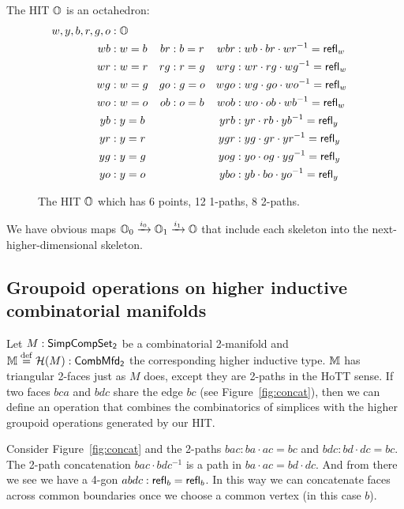 \begin{mydef}
The HIT \( \mathbb{O} \) is an octahedron:
\begin{align*}
w, y, b, r, g, o &: \mathbb{O} \\
wb &: w=b & br &: b=r & wbr &: wb\cdot br\cdot wr^{-1} = \mathsf{refl}_w \\
wr &: w=r & rg &: r=g & wrg &: wr\cdot rg\cdot wg^{-1} = \mathsf{refl}_w \\
wg &: w=g & go &: g=o & wgo &: wg\cdot go\cdot wo^{-1} = \mathsf{refl}_w \\
wo &: w=o & ob &: o=b & wob &: wo\cdot ob\cdot wb^{-1} = \mathsf{refl}_w \\
yb &: y=b & & & yrb &: yr\cdot rb\cdot yb^{-1} = \mathsf{refl}_y \\
yr &: y=r & & & ygr &: yg\cdot gr\cdot yr^{-1} = \mathsf{refl}_y \\
yg &: y=g & & & yog &: yo\cdot og\cdot yg^{-1} = \mathsf{refl}_y \\
yo &: y=o & & & ybo &: yb\cdot bo\cdot yo^{-1} = \mathsf{refl}_y 
\end{align*}
\end{mydef}

\begin{figure}[htbp]
\centering

\caption{The HIT \( \mathbb{O} \) which has 6 points, 12 1-paths, 8 2-paths.}
\end{figure}

We have obvious maps \( \mathbb{O}_0\xrightarrow[]{i_0} \mathbb{O}_1\xrightarrow[]{i_1} \mathbb{O} \) that include each skeleton into the next-higher-dimensional skeleton.

\subsection{Groupoid operations on higher inductive combinatorial manifolds}

Let \( M:\mathsf{SimpCompSet_2} \) be a combinatorial 2-manifold and \( \mathbb{M}\stackrel{\mathrm{def}}{=}\mathcal{H}(M):\mathsf{CombMfd_2} \) the corresponding higher inductive type. \( \mathbb{M} \) has triangular 2-faces just as \( M \) does, except they are 2-paths in the HoTT sense. If two faces \( bca \) and \( bdc \) share the edge \( bc \) (see Figure~\ref{fig:concat}), then we can define an operation that combines the combinatorics of simplices with the higher groupoid operations generated by our HIT. 

Consider Figure~\ref{fig:concat} and the 2-paths \( bac: ba\cdot ac=bc \) and \( bdc: bd\cdot dc = bc \). The 2-path concatenation \( bac\cdot bdc^{-1} \) is a path in \( ba\cdot ac = bd\cdot dc \). And from there we see we have a 4-gon \( abdc:\mathsf{refl}_b=\mathsf{refl}_b \). In this way we can concatenate faces across common boundaries once we choose a common vertex (in this case \( b \)).

